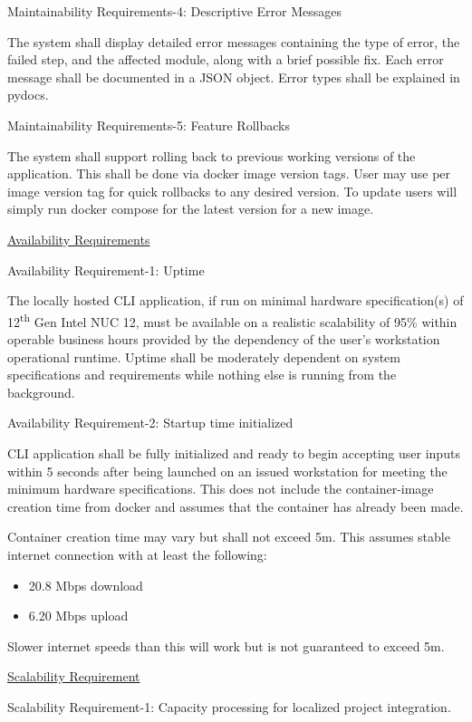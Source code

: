 \documentclass[
]{article}
\begin{document}
Maintainability Requirements-4: Descriptive Error Messages

The system shall display detailed error messages containing the type of
error, the failed step, and the affected module, along with a brief
possible fix. Each error message shall be documented in a JSON object.
Error types shall be explained in pydocs.

Maintainability Requirements-5: Feature Rollbacks

The system shall support rolling back to previous working versions of
the application. This shall be done via docker image version tags. User
may use per image version tag for quick rollbacks to any desired
version. To update users will simply run docker compose for the latest
version for a new image.

\ul{Availability Requirements}

Availability Requirement-1: Uptime

The locally hosted CLI application, if run on minimal hardware
specification(s) of 12\textsuperscript{th} Gen Intel NUC 12, must be
available on a realistic scalability of 95\% within operable business
hours provided by the dependency of the user's workstation operational
runtime. Uptime shall be moderately dependent on system specifications
and requirements while nothing else is running from the background.

Availability Requirement-2: Startup time initialized

CLI application shall be fully initialized and ready to begin accepting
user inputs within 5 seconds after being launched on an issued
workstation for meeting the minimum hardware specifications. This does
not include the container-image creation time from docker and assumes
that the container has already been made.

Container creation time may vary but shall not exceed 5m. This assumes
stable internet connection with at least the following:

\begin{itemize}
\item
  20.8 Mbps download
\item
  6.20 Mbps upload
\end{itemize}

Slower internet speeds than this will work but is not guaranteed to
exceed 5m.

\ul{Scalability Requirement}

Scalability Requirement-1: Capacity processing for localized project
integration.
\end{document}
